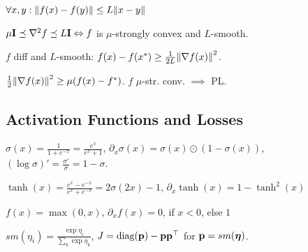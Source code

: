 \begin{definition}[\(L\)-Smooth]
\end{definition}

\begin{definition}
    \(\forall x, y: \norm{f(x) - f(y)} \leq L \norm{x - y}\)
\end{definition}

\begin{theorem}
    \(\mu \vb{I} \preceq \nabla^2 f \preceq L \vb{I} \Leftrightarrow f\) is \(\mu\)-strongly convex and \(L\)-smooth.
\end{theorem}

\begin{lemma}
    \(f\) diff and \(L\)-smooth: \(f(x) - f(x^*) \geq \frac{1}{2L} \norm{\nabla f(x)}^2\).
\end{lemma}

\begin{definition}[PL-condition]
    \(\frac{1}{2} \norm{\nabla f(x)}^2 \geq \mu(f(x) - f^*)\). \(f\) \(\mu\)-str. conv. \(\implies\) PL.
\end{definition}

\subsection{Activation Functions and Losses}

\begin{definition}
    \(\sigma(x) = \frac{1}{1 + e^{-x}} = \frac{e^x}{e^x + 1}\), \(\partial_x \sigma(x) = \sigma(x) \odot (1 - \sigma(x))\), \((\log \sigma)' = \frac{\sigma'}{\sigma} = 1-\sigma\).
\end{definition}

\begin{definition}[Tanh]
    \(\tanh(x) = \frac{e^x - e^{-x}}{e^x + e^{-x}} = 2\sigma(2x) - 1\), \(\partial_x \tanh(x) = 1 - \tanh^2(x)\)
\end{definition}

\begin{definition}[Relu]
    \(f(x) = \max(0, x)\), \(\partial_x f(x) = 0\), if \(x < 0\), else \(1\)
\end{definition}

\begin{definition}[Softmax]
    \(sm(\eta_i) = \frac{\exp\eta_i}{\sum_k \exp \eta_k}\), \(J = \text{diag} (\vb p) - \vb p \vb p^\top\) for \(\vb p = sm(\vb*{\eta})\).
\end{definition}